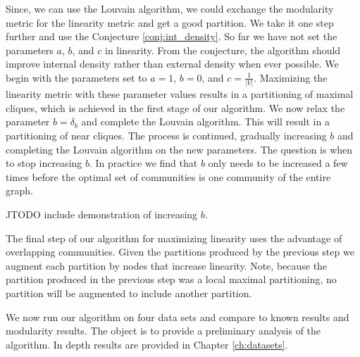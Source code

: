 \documentclass[phd,tocprelim]{cornell}
\begin{document}
Since, we can use the Louvain algorithm, we could exchange the modularity metric for the linearity metric and get a good partition.  We take it one step further and use the Conjecture \ref{conj:int_density}.  So far we have not set the parameters $a$, $b$, and $c$ in linearity.  From the conjecture, the algorithm should improve internal density rather than external density when ever possible.  We begin with the parameters set to $a = 1$, $b = 0$, and $c = \frac{1}{ |V|}$.  Maximizing the linearity metric with these parameter values results in a partitioning of maximal cliques, which is achieved in the first stage of our algorithm.  We now relax the parameter $b = \delta_b$ and complete the Louvain algorithm.  This will result in a partitioning of near cliques.  The process is continued, gradually increasing $b$ and completing the Louvain algorithm on the new parameters.  The question is when to stop increasing $b$.  In practice we find that $b$ only needs to be increased a few times before the optimal set of communities is one community of the entire graph.

JTODO include demonstration of increasing $b$.




The final step of our algorithm for maximizing linearity uses the advantage of overlapping communities.  Given the partitions produced by the previous step we augment each partition by nodes that increase linearity.  Note, because the partition produced in the previous step was a local maximal partitioning, no partition will be augmented to include another partition.

We now run our algorithm on four data sets and compare to known results and modularity results.  The object is to provide a preliminary analysis of the algorithm.  In depth results are provided in Chapter \ref{ch:datasets}.
\end{document}
